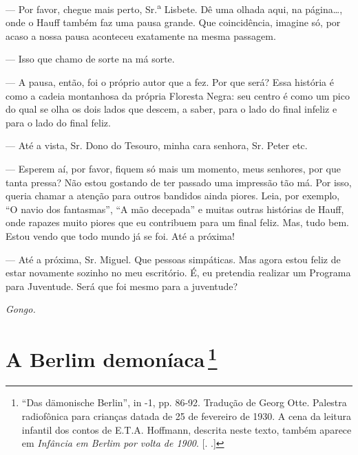 \begin{myparindent}{0pt}
\begin{Parskip}
 --- Por favor, chegue mais perto, Sr.\textsuperscript{a} Lisbete.
Dê uma olhada aqui, na página\ldots{}, onde o Hauff também faz uma pausa
grande. Que coincidência, imagine só, por acaso a nossa pausa aconteceu
exatamente na mesma passagem.

 --- Isso que chamo de sorte na má sorte.

 --- A pausa, então, foi o próprio autor que a fez. Por que será?
Essa história é como a cadeia montanhosa da própria Floresta Negra: seu
centro é como um pico do qual se olha os dois lados que descem, a saber,
para o lado do final infeliz e para o lado do final feliz.

 --- Até a vista, Sr. Dono do Tesouro, minha cara
senhora, Sr. Peter etc.

 --- Esperem aí, por favor, fiquem só mais um momento,
meus senhores, por que tanta pressa? Não estou gostando de ter passado
uma impressão tão má. Por isso, queria chamar a atenção para outros
bandidos ainda piores. Leia, por exemplo, ``O navio dos fantasmas'', ``A
mão decepada'' e muitas outras histórias de Hauff, onde rapazes muito
piores que eu contribuem para um final feliz. Mas, tudo bem. Estou vendo
que todo mundo já se foi. Até a próxima!

 --- Até a próxima, Sr. Miguel. Que pessoas simpáticas. Mas agora
estou feliz de estar novamente sozinho no meu escritório. É, eu
pretendia realizar um Programa para Juventude. Será que foi mesmo para a
juventude?

\emph{Gongo.}
\end{Parskip}
\end{myparindent}

\chapter{A Berlim demoníaca\,\footnote[*]{``Das dämonische Berlin'',
  in  -1, pp. 86-92. Tradução de Georg Otte. Palestra radiofônica
  para crianças datada de 25 de fevereiro de 1930. A cena da leitura
  infantil dos contos de E.T.A. Hoffmann, descrita neste texto, também
  aparece em \emph{Infância em Berlim por volta de 1900}. [. .]} }

